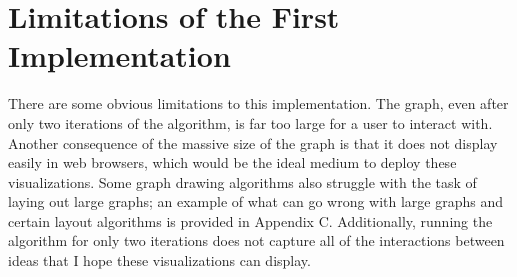\documentclass[man, 12pt, floatsintext, donotrepeattitle]{apa6}
\begin{document}
\section{Limitations of the First Implementation}
There are some obvious limitations to this implementation.  The graph,
even after only two iterations of the algorithm, is far too large for a user to interact
with.  Another consequence of the massive size of the graph is that it does
not display easily in web browsers, which would be the ideal medium to deploy
these visualizations. Some graph drawing algorithms also struggle with the
task of laying out large graphs; an example of what can go wrong with large
graphs and certain layout algorithms is provided in Appendix C.  Additionally,
running the algorithm for only two
iterations does not capture all of the interactions between ideas that I hope
these visualizations can display.
\end{document}
